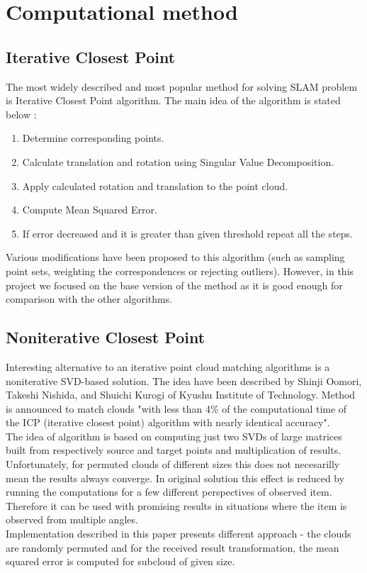 \documentclass[titlepage]{article}
\begin{document}
\section{Computational method}

\subsection{Iterative Closest Point}
The most widely described and most popular method for solving SLAM problem is Iterative Closest Point algorithm. The main idea of the algorithm is stated below \cite{ms-pres1}:
\begin{enumerate}
\item Determine corresponding points.
\item Calculate translation and rotation using Singular Value Decomposition.
\item Apply calculated rotation and translation to the point cloud.
\item Compute Mean Squared Error.
\item If error decreased and it is greater than given threshold repeat all the steps.
\end{enumerate}

Various modifications have been proposed to this algorithm (such as sampling point sets, weighting the correspondences or rejecting outliers). However, in this project we focused on the base version of the method as it is good enough for comparison with the other algorithms.

\subsection{Noniterative Closest Point}
Interesting alternative to an iterative point cloud matching algorithms is a noniterative SVD-based solution. The idea have been described by Shinji Oomori, Takeshi Nishida, and Shuichi Kurogi of Kyushu Institute of Technology. Method is announced to match clouds "with less than 4\% of the computational
time of the ICP (iterative closest point) algorithm with nearly identical accuracy"\cite{nicp}.\\
The idea of algorithm is based on computing just two SVDs of large matrices built from respectively source and target points and multiplication of results. Unfortunately, for permuted clouds of different sizes this does not necesarilly mean the results always converge. In original solution this effect is reduced by running the computations for a few different perspectives of observed item. Therefore it can be used with promising results in situations where the item is observed from multiple angles.\\
Implementation described in this paper presents different approach - the clouds are randomly permuted and for the received result transformation, the mean squared error is computed for subcloud of given size.
\end{document}
